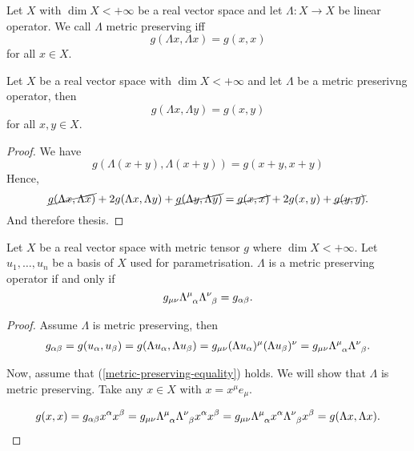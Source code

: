 \documentclass[main.tex]{subfiles}
\begin{document}
\begin{definition}
Let $X$ with $\dim X < +\infty$ be a real vector space and let $\Lambda: X \to X$ be linear operator. We call $\Lambda$ metric preserving iff
\begin{equation}
g(\Lambda x, \Lambda x) = g(x, x)
\end{equation}
for all $x \in X$.
\end{definition}

\begin{lemma}
\label{metric-preserving-sep}
Let $X$ be a real vector space with $\dim X < +\infty$ and let $\Lambda$ be a metric preserivng operator, then
\begin{equation}
g(\Lambda x, \Lambda y) = g(x, y)
\end{equation} 
for all $x, y\in X$.
\end{lemma}
\begin{proof}
We have
\begin{equation}
g(\Lambda (x + y), \Lambda (x + y)) = g(x + y, x + y)
\end{equation}
Hence,
\begin{equation}
\cancel{g(\Lambda x, \Lambda x)} + 2g(\Lambda x, \Lambda y) + \cancel{g(\Lambda y, \Lambda y)} =
\cancel{g(x, x)} + 2g(x, y) + \cancel{g(y, y)}.
\end{equation}
And therefore thesis.
\end{proof}

\begin{theorem}
Let $X$ be a real vector space with metric tensor $g$ where $\dim X < +\infty$. Let $u_1, \dots, u_n$ be a basis of $X$ used for parametrisation. $\Lambda$ is a metric preserving operator if and only if
\begin{equation}
\label{metric-preserving-equality}
g_{\mu\nu} \tensor{\Lambda}{^\mu_\alpha} \tensor{\Lambda}{^\nu_\beta} = g_{\alpha\beta}. 
\end{equation}
\end{theorem}
\begin{proof}
Assume $\Lambda$ is metric preserving, then
\begin{align}
g_{\alpha\beta} = g(u_\alpha, u_\beta) = g(\Lambda u_\alpha, \Lambda u_\beta) = 
g_{\mu\nu} (\Lambda u_\alpha)^\mu (\Lambda u_\beta)^\nu = g_{\mu\nu} \tensor{\Lambda}{^\mu_\alpha}\tensor{\Lambda}{^\nu_\beta}.
\end{align}

Now, assume that (\ref{metric-preserving-equality}) holds. We will show that $\Lambda$ is metric preserving. Take any $x\in X$ with $x = x^\mu e_\mu$.

\begin{align}
g(x, x) = g_{\alpha\beta} x^\alpha x^\beta 
= g_{\mu\nu} \tensor{\Lambda}{^\mu_\alpha}\tensor{\Lambda}{^\nu_\beta} x^\alpha x^\beta =  g_{\mu\nu} \tensor{\Lambda}{^\mu_\alpha} x^\alpha\tensor{\Lambda}{^\nu_\beta} x^\beta = g(\Lambda x, \Lambda x).
\end{align}
\end{proof}
\end{document}
